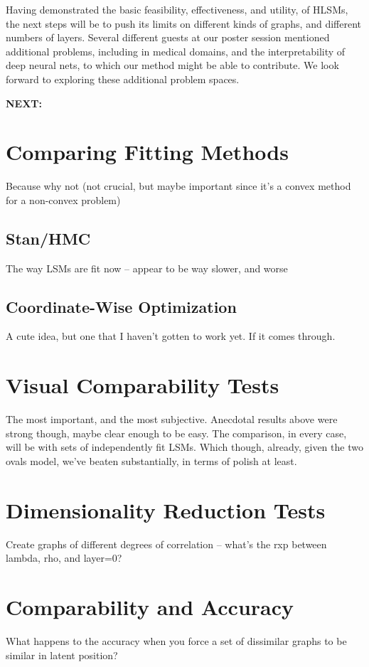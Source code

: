 \documentclass{article}
\begin{document}
Having demonstrated the basic feasibility, effectiveness, and utility, of HLSMs, the next steps will be to push its limits on different kinds of graphs, and different numbers of layers. Several different guests at our poster session mentioned additional problems, including in medical domains, and the interpretability of deep neural nets, to which our method might be able to contribute. We look forward to exploring these additional problem spaces.
\clearpage


\textbf{NEXT:}
\section{Comparing Fitting Methods}
Because why not (not crucial, but maybe important since it's a convex method for a non-convex problem)
\subsection{Stan/HMC}
The way LSMs are fit now -- appear to be way slower, and worse
\subsection{Coordinate-Wise Optimization}
A cute idea, but one that I haven't gotten to work yet. If it comes through.

\section{Visual Comparability Tests}
The most important, and the most subjective. Anecdotal results above were strong though, maybe clear enough to be easy. The comparison, in every case, will be with sets of independently fit LSMs. Which though, already, given the two ovals model, we've beaten substantially, in terms of polish at least.

\section{Dimensionality Reduction Tests}
Create graphs of different degrees of correlation -- what's the rxp between lambda, rho, and layer=0?

\section{Comparability and Accuracy}
What happens to the accuracy when you force a set of dissimilar graphs to be similar in latent position?
\end{document}
